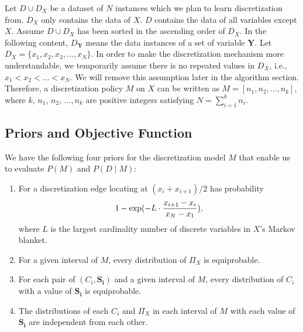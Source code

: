 Let $D \cup D_X$ be a dataset of $N$ instances which we plan to learn discretization from. $D_X$ only contains the data of $X$. $D$ contains the data of all variables except $X$.  Assume $D \cup D_X$ has been sorted in the ascending order of $D_X$. In the following content, $D_{\boldsymbol{Y}}$ means the data instances of a set of variable $\boldsymbol{Y}$. Let $D_X = \{ x_1,x_2,x_3,\ldots,x_N \}$. In order to make the discretization mechanism more understandable, we temporarily assume there is no repeated values in $D_X$, i.e., $x_1 < x_2 < \ldots < x_N$. We will remove this assumption later in the algorithm section. Therefore, a discretization policy $M$ on $X$ can be written as $M = [n_1,n_2,\ldots,n_k]$, where $k$, $n_1$, $n_2$, $\ldots,n_k$ are positive integers satisfying $N = \sum_{i=1}^k n_i$.



\subsection{Priors and Objective Function}
\label{obj}
We have the following four priors for the discretization model $M$ that enable us to evaluate $P(M)$ and $P(D \mid M)$:\\
\begin{enumerate}
\item For a discretization edge locating at $(x_i + x_{i+1})/2$ has probability
\begin{equation}
1 - {\exp(- L \cdot {{x_{i+1} - x_i}\over{x_N - x_1}})},
\end{equation}
where $L$ is the largest cardinality number of discrete variables in $X$'s Markov blanket.
\item For a given interval of $M$, every distribution of $\Pi_X$ is equiprobable.
\item For each pair of $(C_i,\boldsymbol{S_i})$ and a given interval of $M$, every distribution of $C_i$ with a value of $\boldsymbol{S_i}$ is equiprobable.
\item The distributions of each $C_i$ and $\Pi_X$ in each interval of $M$ with each value of $\boldsymbol{S_i}$ are independent from each other.
\end{enumerate} 

